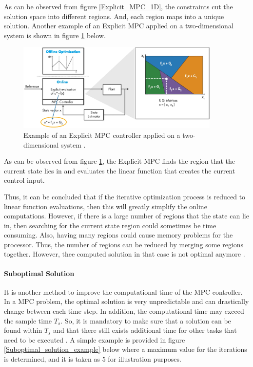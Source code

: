 \documentclass{thesisreport}
\begin{document}
\noindent As can be observed from figure \ref{Explicit_MPC_1D}, the constraints cut the solution space into different regions. And, each region maps into a unique solution.
Another example of an Explicit MPC applied on a two-dimensional system is shown in figure \ref{Explicit_MPC_2D} below. 

\newpage

\begin{figure}[h]
\centering
\includegraphics[width=0.9\textwidth]{Images/Control/Explicit_MPC_b}
\caption{Example of an Explicit MPC controller applied on a two-dimensional system \cite{MathWorks2018_new}.}
\label{Explicit_MPC_2D}
\end{figure}

\noindent As can be observed from figure \ref{Explicit_MPC_2D}, the Explicit MPC finds the  region that the current state lies in and evaluates the linear function that creates the current control input.

\noindent Thus, it can be concluded that if the iterative optimization process is reduced to linear function evaluations, then this will greatly simplify the online computations. However, if there is a large number of regions that the state can lie in, then searching for the current state region could sometimes be time consuming. Also, having many regions could cause memory problems for the processor. Thus, the number of regions can be reduced by merging some regions together. However, thee computed solution in that case is not optimal anymore \cite{Hovland2008}.

\paragraph{Suboptimal Solution}
It is another method to improve the computational time of the MPC controller. In a MPC problem, the optimal solution is very unpredictable and can drastically change between each time step. In addition, the computational time may exceed the sample time $T_s$. So, it is mandatory to make sure that a solution can be found within $T_s$ and that there still exists additional time for other tasks that need to be executed \cite{Gulez2014}. A simple example is provided in figure \ref{Suboptimal_solution_example} below where a maximum value for the iterations is determined, and it is taken as 5 for illustration purposes. 
\end{document}
